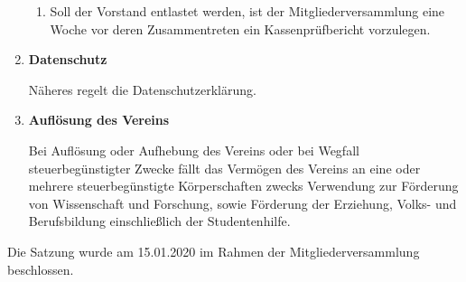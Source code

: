 \documentclass[german]{article}
\newcommand{\paragr}[1]{\item \textsf{\textbf{#1}}}
\begin{document}
\begin{enumerate}
\begin{enumerate}
			\item Soll der Vorstand entlastet werden, ist der Mitgliederversammlung eine Woche vor deren Zusammentreten ein Kassenprüfbericht vorzulegen.
			
		\end{enumerate}
		
		
		\paragr{Datenschutz}
		
		Näheres regelt die Datenschutzerklärung.
		
		
		\paragr{Auflösung des Vereins}
		
		Bei Auflösung oder Aufhebung des Vereins oder bei Wegfall steuerbegünstigter Zwecke fällt das Vermögen des Vereins an eine oder mehrere steuerbegünstigte Körperschaften zwecks Verwendung zur Förderung von Wissenschaft und Forschung, sowie Förderung der Erziehung, Volks- und Berufsbildung einschließlich der Studentenhilfe.
		
		
	\end{enumerate}
	\vspace{2cm}
	Die Satzung wurde am 15.01.2020 im Rahmen der Mitgliederversammlung beschlossen.
	
\end{document}
